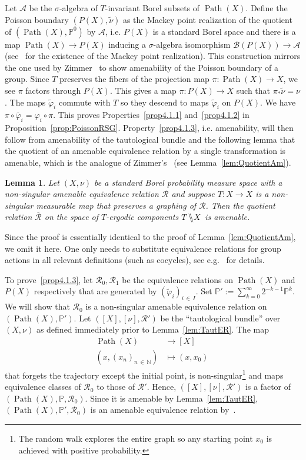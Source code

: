 \documentclass[10pt]{amsart}
\newtheorem{lemm}[theo]{Lemma}\newtheorem{prop}[theo]{Proposition}\newtheorem{coro}[theo]{Corollary}\newtheorem{conj}[theo]{Conjecture}
\theoremstyle{definition}\newtheorem{defi}[theo]{Definition}\newtheorem{rema}[theo]{Remark}\newtheorem{exam}[theo]{Example}\newtheorem{exem}[theo]{Example}\newtheorem{nota}[theo]{Notation}
\DeclareMathOperator{\Path}{Path}
\newcommand{\bbN}{\mathbb{N}}
\newcommand{\bbP}{\mathbb{P}}
\newcommand{\calR}{\mathcal{R}}
\newcommand{\calA}{\mathcal{A}}
\newcommand{\calB}{\mathcal{B}}
\newcommand{\backsslash}{\mathbin{\mkern-2mu \char`\\ \mkern-6mu \char`\\ \mkern-4mu}}
\begin{document}
Let $\calA$ be the $\sigma$-algebra of $T$-invariant Borel subsets of $\Path(X)$. Define the Poisson boundary $(P(X),\widetilde{\nu})$ as the Mackey point realization of the quotient of $(\Path(X),\bbP^0)$ by $\calA$, i.e. $P(X)$ is a standard Borel space and there is a map $\Path(X)\to P(X)$ inducing a $\sigma$-algebra isomorphism $\calB(P(X))\to \calA$ (see~\cite{Mackey62} for the existence of the Mackey point realization). This construction mirrors the one used by Zimmer~\cite{Zimmer78} to show amenability of the Poisson boundary of a group. Since $T$ preserves the fibers of the projection map $\pi\colon\Path(X)\to X$, we see $\pi$ factors through $P(X)$. This gives a map $\pi \colon P(X)\to X$ such that $\pi_*\widetilde{\nu}=\nu$. The maps $\widetilde\varphi_i$ commute with $T$ so they descend to maps $\widetilde\varphi_i$ on $P(X)$. We have $\pi\circ \widetilde{\varphi_i}=\varphi_i\circ \pi$. This proves Properties~\eqref{prop4.1.1} and~\eqref{prop4.1.2}  in Proposition~\ref{prop:PoissonRSG}. Property~\eqref{prop4.1.3}, i.e. amenability, will then follow from amenability of the tautological bundle and the following lemma that the quotient of an amenable equivalence relation by a single transformation is amenable, which is the analogue of Zimmer's~\cite[Theorem~3.3]{Zimmer78} (see Lemma~\ref{lem:QuotientAm}).

\begin{lemm}\label{lem:QuotientAMforER}
Let $(X,\nu)$ be a standard Borel probability measure space with a non-singular amenable equivalence relation $\calR$ and suppose $T:X\to X$ is a non-singular measurable map that preserves a graphing of $\calR$. Then the quotient relation $\overline{\calR}$ on the space of $T$-ergodic components $T\backsslash X$ is amenable.
\end{lemm}

Since the proof is essentially identical to the proof of Lemma~\ref{lem:QuotientAm}, we omit it here. One only needs to substitute equivalence relations for group actions in all relevant definitions (such as cocycles), see e.g.~\cite[Proposition~3.3]{MR1242044} for details.


To prove~\eqref{prop4.1.3}, let $\calR_0,\calR_1$ be the equivalence relations on $\Path(X)$ and $P(X)$ respectively that are generated by $(\widetilde \varphi_i)_{i\,\in\,I}$. Set $\bbP':=\sum_{k=0}^\infty 2^{-k-1}{\bbP^k}.$ We will show that $\calR_0$ is a non-singular amenable equivalence relation on $(\Path(X),\bbP')$. Let $([X],[\nu],\calR')$ be the ``tautological bundle'' over $(X,\nu)$ as defined immediately prior to Lemma~\ref{lem:TautER}. The map
\begin{align*}
\Path(X) &\longrightarrow [X]\\
\left(x,(x_n)_{n\,\in\,\bbN}\right)&\mapsto (x,x_0)\
\end{align*}
that forgets the trajectory except the initial point, is non-singular\footnote{The random walk explores the entire graph so any starting point $x_0$ is achieved with positive probability.} and maps equivalence classes of $\calR_0$ to those of $\calR'$. Hence, $([X],[\nu],\calR')$ is a factor of $(\Path(X),\bbP,\calR_0)$. Since it is amenable by Lemma~\ref{lem:TautER}, $(\Path(X),\bbP',\calR_0)$ is an amenable equivalence relation by~\cite[Theorem~2.4]{Zimmer78}.
\end{document}
